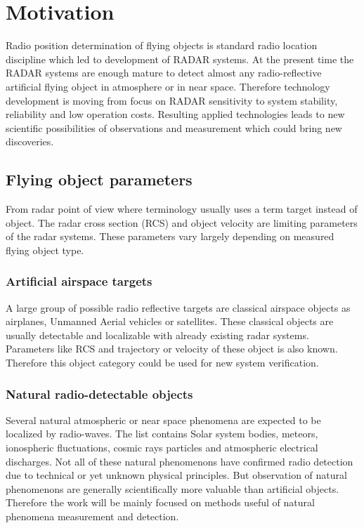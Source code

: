 \documentclass[twoside]{ctuthesis}
\theoremstyle{plain}
\theoremstyle{definition}
\theoremstyle{note}
\begin{document}
\maketitle

\chapter{Motivation}

Radio position determination of flying objects is standard radio location discipline which led to development of RADAR systems. At the present time the RADAR systems are enough mature to detect almost any radio-reflective artificial flying object in atmosphere or in near space. Therefore technology development is moving from focus on RADAR sensitivity to system stability, reliability and low operation costs. Resulting applied technologies leads to new scientific possibilities of observations and measurement which could bring new discoveries. 

\section{Flying object parameters}

From radar point of view where terminology usually uses a term target instead of object. The radar cross section (RCS) and object velocity are limiting parameters of the radar systems. These parameters vary largely depending on measured flying object type. 

\subsection{Artificial airspace targets}

A large group of possible radio reflective targets are classical airspace objects as airplanes, Unmanned Aerial vehicles or satellites. These classical objects are usually detectable and localizable with already existing radar systems. Parameters like RCS and trajectory or velocity of these object is also known. Therefore this object category could be used for new system verification. 

\subsection{Natural radio-detectable objects}

Several natural atmospheric or near space phenomena are expected to be localized by radio-waves. The list contains Solar system bodies, meteors, ionospheric fluctuations, cosmic rays particles and atmospheric electrical discharges. Not all of these natural phenomenons have confirmed radio detection due to technical or yet unknown physical principles. But observation of natural phenomenons are generally scientifically more valuable than artificial objects. Therefore the work will be mainly focused on methods useful of natural phenomena measurement and detection. 
\end{document}
